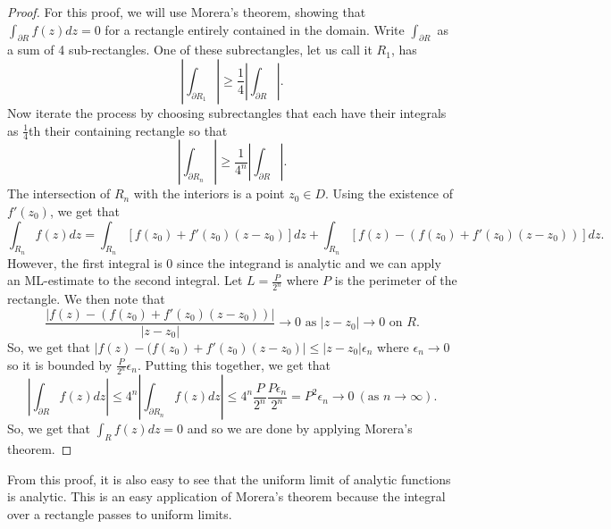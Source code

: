 \documentclass[11pt,leqno,oneside]{amsart}
\numberwithin{thm}{section}
\begin{document}
  \begin{proof}
    For this proof, we will use Morera's theorem, showing that
    $\int_{\partial R} f(z)dz = 0$ for a rectangle entirely contained
    in the domain. Write $\int_{\partial R}$ as a sum of 4
    sub-rectangles. One of these subrectangles, let us call it $R_1$,
    has \[
      \left|
        \int_{\partial R_1}
      \right| \geq
      \frac{1}{4}\left|
        \int_{\partial R}
      \right|.
    \]
    Now iterate the process by choosing subrectangles that each have
    their integrals as $\frac{1}{4}$th their containing rectangle so that \[
      \left|
        \int_{\partial R_n}
      \right| \geq
      \frac{1}{4^n}\left|
        \int_{\partial R}
      \right|.
    \]
    The intersection of $R_n$ with the interiors is a point $z_0 \in
    D$. Using the existence of $f'(z_0)$, we get that \[
      \int_{R_n} f(z)dz = \int_{R_n} [f(z_0) + f'(z_0)(z-z_0)]dz +
      \int_{R_n} [f(z) - (f(z_0) + f'(z_0)(z-z_0))]dz.
    \]
    However, the first integral is 0 since the integrand is analytic
    and we can apply an ML-estimate to the second integral. Let $L =
    \frac{P}{2^n}$ where $P$ is the perimeter of the rectangle. We
    then note that \[
      \frac{|f(z)-(f(z_0) + f'(z_0)(z-z_0))|}{|z-z_0|} \to 0 \text{ as
      } |z-z_0| \to 0 \text{ on } R.
    \]
    So, we get that $|f(z)-(f(z_0) + f'(z_0)(z-z_0)| \leq |z-z_0|
    \epsilon_n$ where $\epsilon_n \to 0$ so it is bounded by
    $\frac{P}{2^n}\epsilon_n$. Putting this together, we get that \[
      \left|
        \int_{\partial R} f(z)dz
      \right| \leq 4^n
      \left|
        \int_{\partial R_n} f(z)dz
      \right| \leq 4^n \frac{P}{2^n}\frac{P \epsilon_n}{2^n} = P^2
      \epsilon_n \to 0 ~ (\text{as }n \to \infty).
    \]
    So, we get that $\int_R f(z)dz = 0$ and so we are done by applying
    Morera's theorem.
  \end{proof}
  From this proof, it is also easy to see that the uniform limit of
  analytic functions is analytic. This is an easy application of
  Morera's theorem because the integral over a rectangle passes to
  uniform limits.
\end{document}

